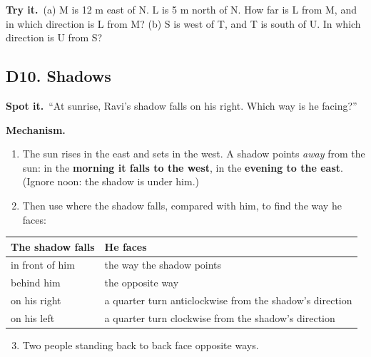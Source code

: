 \documentclass[11pt,a4paper]{article}
\let\oldsubsection\subsection
\renewcommand{\subsection}{\needspace{9\baselineskip}\oldsubsection}
\newcommand{\spot}{\textbf{\color{ember}Spot it.}\ }
\newcommand{\mech}{\textbf{\color{ember}Mechanism.}\ }
\newcommand{\tryit}[1]{\textbf{\color{ember}Try it.}\ #1}
\begin{document}
\tryit (a) M is 12 m east of N. L is 5 m north of N. How far is L from M, and in which direction is L from M? (b) S is west of T, and T is south of U. In which direction is U from S?

\subsection{D10. Shadows}
\spot ``At sunrise, Ravi's shadow falls on his right. Which way is he facing?''

\mech
\begin{enumerate}
\item The sun rises in the east and sets in the west. A shadow points \emph{away} from the sun: in the \textbf{morning it falls to the west}, in the \textbf{evening to the east}. (Ignore noon: the shadow is under him.)
\item Then use where the shadow falls, compared with him, to find the way he faces:
\end{enumerate}
\begin{center}\small\renewcommand{\arraystretch}{1.18}\setlength{\tabcolsep}{9pt}
\begin{tabular}{@{}ll@{}}
\toprule
\textbf{\color{slate}The shadow falls} & \textbf{\color{slate}He faces} \\ \midrule
in front of him & the way the shadow points \\
behind him & the opposite way \\
on his right & a quarter turn anticlockwise from the shadow's direction \\
on his left & a quarter turn clockwise from the shadow's direction \\
\bottomrule
\end{tabular}\end{center}
\begin{enumerate}
\setcounter{enumi}{2}
\item Two people standing back to back face opposite ways.
\end{enumerate}
\end{document}
